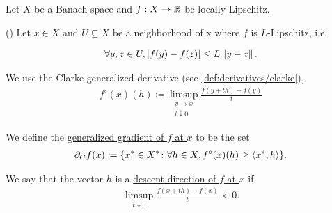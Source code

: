 Let $X$ be a Banach space and $f: X \to \mathbb{R}$ be locally Lipschitz.

\begin{definition}\label{def:clarke_gradient}(\cite[definition 10.3]{Clarke2013})
  Let $x \in X$ and $U \subseteq X$ be a neighborhood of x where $f$ is $L$-Lipschitz, i.e.

  \begin{align*}
    \forall y, z \in U, \left\vert f(y) - f(z) \right\vert \leq L \left\Vert y - z \right\Vert.
  \end{align*}

  We use the Clarke generalized derivative (see \cref{def:derivatives/clarke}),
  \begin{align*}
    f^\circ(x)(h) \coloneqq \limsup_{\substack{y \to x \\ t \downarrow 0}} \frac {f(y + th) - f(y)} t
  \end{align*}

  We define the \uline{generalized gradient of $f$ at $x$} to be the set
  \begin{align*}
    \partial_C f(x) \coloneqq \{ x^* \in X^* \colon \forall h \in X, f^\circ(x)(h) \geq \left\langle x^*, h \right\rangle \}.
  \end{align*}

  We say that the vector $h$ is a \uline{descent direction of $f$ at $x$} if
  \begin{align*}
    \limsup_{t \downarrow 0} \frac {f(x + th) - f(x)} t < 0.
  \end{align*}
\end{definition}

